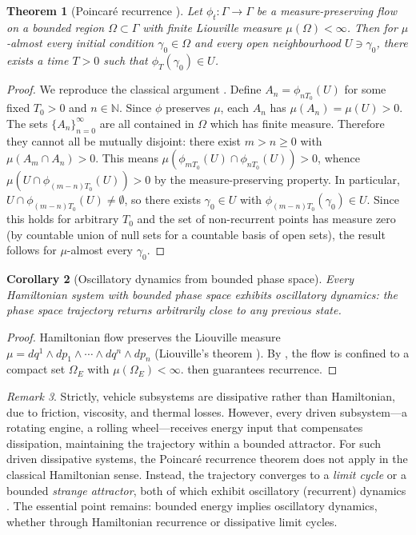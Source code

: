 \documentclass[twocolumn,10pt,a4paper]{article}
\newtheorem{theorem}{Theorem}[section]
\newtheorem{corollary}[theorem]{Corollary}
\theoremstyle{definition}
\theoremstyle{remark}
\newtheorem{remark}[theorem]{Remark}
\newcommand{\N}{\mathbb{N}}
\begin{document}
\begin{theorem}[Poincar\'{e} recurrence \citep{Poincare1890}]\label{thm:poincare}
Let $\phi_t : \Gamma \to \Gamma$ be a measure-preserving flow on a bounded region $\Omega \subset \Gamma$ with finite Liouville measure $\mu(\Omega) < \infty$. Then for $\mu$-almost every initial condition $\gamma_0 \in \Omega$ and every open neighbourhood $U \ni \gamma_0$, there exists a time $T > 0$ such that $\phi_T(\gamma_0) \in U$.
\end{theorem}

\begin{proof}
We reproduce the classical argument \citep{Arnold1978}. Define $A_n = \phi_{nT_0}(U)$ for some fixed $T_0 > 0$ and $n \in \N$. Since $\phi$ preserves $\mu$, each $A_n$ has $\mu(A_n) = \mu(U) > 0$. The sets $\{A_n\}_{n=0}^\infty$ are all contained in $\Omega$ which has finite measure. Therefore they cannot all be mutually disjoint: there exist $m > n \geq 0$ with $\mu(A_m \cap A_n) > 0$. This means $\mu(\phi_{mT_0}(U) \cap \phi_{nT_0}(U)) > 0$, whence $\mu(U \cap \phi_{(m-n)T_0}(U)) > 0$ by the measure-preserving property. In particular, $U \cap \phi_{(m-n)T_0}(U) \neq \emptyset$, so there exists $\gamma_0 \in U$ with $\phi_{(m-n)T_0}(\gamma_0) \in U$. Since this holds for arbitrary $T_0$ and the set of non-recurrent points has measure zero (by countable union of null sets for a countable basis of open sets), the result follows for $\mu$-almost every $\gamma_0$.
\end{proof}

\begin{corollary}[Oscillatory dynamics from bounded phase space]\label{cor:oscillatory}
Every Hamiltonian system with bounded phase space exhibits oscillatory dynamics: the phase space trajectory returns arbitrarily close to any previous state.
\end{corollary}

\begin{proof}
Hamiltonian flow preserves the Liouville measure $\mu = dq^1 \wedge dp_1 \wedge \cdots \wedge dq^n \wedge dp_n$ (Liouville's theorem \citep{Arnold1978, Goldstein2002}). By , the flow is confined to a compact set $\Omega_E$ with $\mu(\Omega_E) < \infty$.  then guarantees recurrence.
\end{proof}

\begin{remark}
Strictly, vehicle subsystems are dissipative rather than Hamiltonian, due to friction, viscosity, and thermal losses. However, every driven subsystem---a rotating engine, a rolling wheel---receives energy input that compensates dissipation, maintaining the trajectory within a bounded attractor. For such driven dissipative systems, the Poincar\'{e} recurrence theorem does not apply in the classical Hamiltonian sense. Instead, the trajectory converges to a \emph{limit cycle} or a bounded \emph{strange attractor}, both of which exhibit oscillatory (recurrent) dynamics \citep{Strogatz2000}. The essential point remains: bounded energy implies oscillatory dynamics, whether through Hamiltonian recurrence or dissipative limit cycles.
\end{remark}
\end{document}
